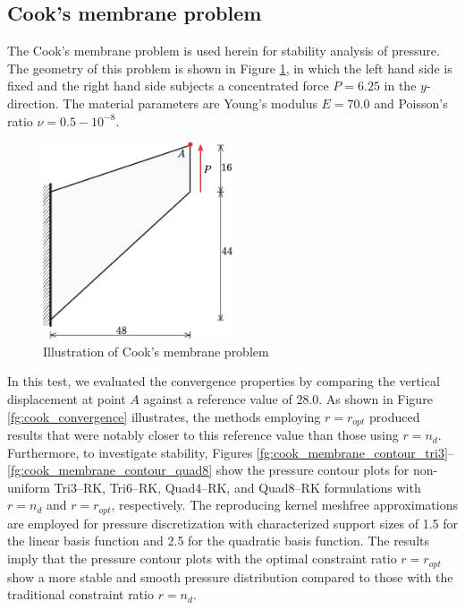 \subsection{Cook's membrane problem}

The Cook's membrane problem \cite{simo1990} is used herein for stability analysis of pressure. The geometry of this problem is shown in Figure \ref{fg:cook_illsutration}, in which the left hand side is fixed and the right hand side subjects a concentrated force $P=6.25$ in the $y$-direction. The material parameters are Young's modulus $E=70.0$ and Poisson's ratio $\nu=0.5-10^{-8}$.

\begin{figure}[H]
\centering
\includegraphics[width=0.5\textwidth]{png/cook_membrane_model_r1.png}
\caption{Illustration of Cook's membrane problem}\label{fg:cook_illsutration}
\end{figure}

In this test, we evaluated the convergence properties by comparing the vertical displacement at point $A$ against a reference value of $28.0$. 
As shown in Figure \ref{fg:cook_convergence} illustrates, the methods employing $r=r_{opt}$ produced results that were notably closer to this reference value than those using $r=n_d$.
Furthermore, to investigate stability, Figures \ref{fg:cook_membrane_contour_tri3}--\ref{fg:cook_membrane_contour_quad8} show the pressure contour plots for non-uniform Tri3--RK, Tri6--RK, Quad4--RK, and Quad8--RK formulations with $r=n_d$ and $r=r_{opt}$, respectively.
The reproducing kernel meshfree approximations are employed for pressure discretization with characterized support sizes of 1.5 for the linear basis function and 2.5 for the quadratic basis function. The results imply that the pressure contour plots with the optimal constraint ratio $r=r_{opt}$ show a more stable and smooth pressure distribution compared to those with the traditional constraint ratio $r=n_d$.

